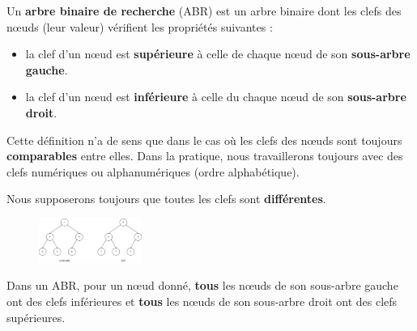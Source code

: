 \documentclass[
  a4paper,
  DIV=11,
  numbers=noendperiod]{scrartcl}
\providecommand{\tightlist}{%
  \setlength{\itemsep}{0pt}\setlength{\parskip}{0pt}}\usepackage{longtable,booktabs,array}
\begin{document}
\begin{tcolorbox}[enhanced jigsaw, titlerule=0mm, opacityback=0, toptitle=1mm, opacitybacktitle=0.6, breakable, colback=white, title=\textcolor{quarto-callout-tip-color}{\faLightbulb}\hspace{0.5em}{Définition}, bottomtitle=1mm, arc=.35mm, colbacktitle=quarto-callout-tip-color!10!white, rightrule=.15mm, bottomrule=.15mm, leftrule=.75mm, toprule=.15mm, left=2mm, coltitle=black]

Un \textbf{arbre binaire de recherche} (ABR) est un arbre binaire dont
les clefs des nœuds (leur valeur) vérifient les propriétés suivantes :

\begin{itemize}
\tightlist
\item
  la clef d'un nœud est \textbf{supérieure} à celle de chaque nœud de
  son \textbf{sous-arbre gauche}.
\item
  la clef d'un nœud est \textbf{inférieure} à celle du chaque nœud de
  son \textbf{sous-arbre droit}.
\end{itemize}

\end{tcolorbox}

Cette définition n'a de sens que dans le cas où les clefs des nœuds sont
toujours \textbf{comparables} entre elles. Dans la pratique, nous
travaillerons toujours avec des clefs numériques ou alphanumériques
(ordre alphabétique).

Nous supposerons toujours que toutes les clefs sont
\textbf{différentes}.

\begin{figure}

{\centering \includegraphics[width=0.3\textwidth,height=\textheight]{ABR.png}

}

\end{figure}

\begin{tcolorbox}[enhanced jigsaw, titlerule=0mm, opacityback=0, toptitle=1mm, opacitybacktitle=0.6, breakable, colback=white, title=\textcolor{quarto-callout-note-color}{\faInfo}\hspace{0.5em}{Remarque}, bottomtitle=1mm, arc=.35mm, colbacktitle=quarto-callout-note-color!10!white, rightrule=.15mm, bottomrule=.15mm, leftrule=.75mm, toprule=.15mm, left=2mm, coltitle=black]

Dans un ABR, pour un nœud donné, \textbf{tous} les nœuds de son
sous-arbre gauche ont des clefs inférieures et \textbf{tous} les nœuds
de son sous-arbre droit ont des clefs supérieures.

\end{tcolorbox}
\end{document}
